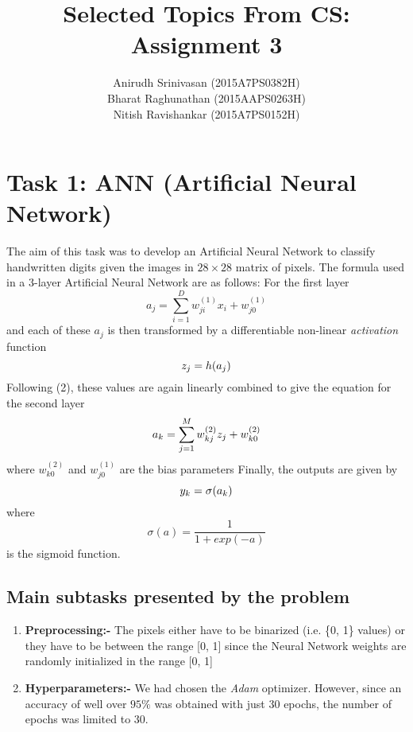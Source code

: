 \documentclass{article}
\begin{document}
    \title{Selected Topics From CS: Assignment 3}
    \author{Anirudh Srinivasan (2015A7PS0382H) \\ Bharat Raghunathan (2015AAPS0263H) \\ Nitish Ravishankar (2015A7PS0152H) }
    \maketitle

\tableofcontents

\large
\section{Task 1: ANN (Artificial Neural Network)}
The aim of this task was to develop an Artificial Neural Network
to classify handwritten digits given the images in $28\times28$ matrix of pixels.
The formula used in a $3$-layer Artificial Neural Network are as follows:
For the first layer
\begin{equation}
a_j = \sum_{i=1}^D w_{ji}^{(1)}x_i + w_{j0}^{(1)}
\end{equation}
and each of these $a_j$ is then transformed by a differentiable non-linear \emph{activation} function
\begin{equation}
    \large
    z_j = h(a_j)
\end{equation}
Following (2), these values are again linearly combined to give the equation for the second layer
\begin{equation}
    \large
    a_k = \sum_{j=1}^M w_{kj}^{(2)}z_j + w_{k0}^{(2)}
\end{equation}
where $w_{k0}^{(2)}$ and $w_{j0}^{(1)}$ are the bias parameters
Finally, the outputs are given by
\begin{equation}
    \large
    y_k = \sigma(a_k) 
\end{equation}
where
\begin{equation}
    \sigma(a) = \frac{1}{1 + exp(-a)}
\end{equation}
is the sigmoid function.
\subsection{Main subtasks presented by the problem}
\begin{enumerate}
 \item \textbf{Preprocessing:-} The pixels either have to be binarized (i.e. \{0, 1\} values) or they have to
 be between the range [0, 1] since the Neural Network weights are randomly initialized in the range [0, 1]
 \item \textbf{Hyperparameters:-} We had chosen the \textit{Adam} optimizer.
 However, since an accuracy of well over $95\%$ was obtained with just $30$ epochs, the number of epochs was limited to $30$.
\end{enumerate}
\end{document}
